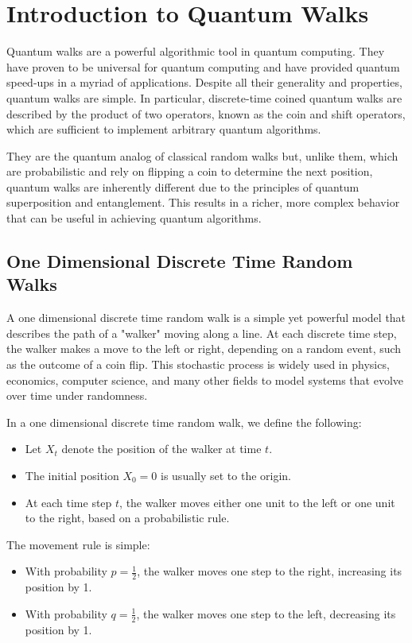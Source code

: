 \documentclass{article}
\begin{document}
\newpage

\section{Introduction to Quantum Walks}
	Quantum walks are a powerful algorithmic tool in quantum computing. They have proven to be universal for quantum computing \cite{universalcontrolplane} and have provided quantum speed-ups in a myriad of applications. Despite all their generality and properties, quantum walks are simple. In particular, discrete-time coined quantum walks are described by the product of two operators, known as the coin and shift operators, which are sufficient to implement arbitrary quantum algorithms.

	They are the quantum analog of classical random walks but, unlike them, which are probabilistic and rely on flipping a coin to determine the next position, quantum walks are inherently different due to the principles of quantum superposition and entanglement. This results in a richer, more complex behavior that can be useful in achieving quantum algorithms.

	\subsection{One Dimensional Discrete Time Random Walks}

		A one dimensional discrete time random walk is a simple yet powerful model that describes the path of a "walker" moving along a line. At each discrete time step, the walker makes a move to the left or right, depending on a random event, such as the outcome of a coin flip. This stochastic process is widely used in physics, economics, computer science, and many other fields to model systems that evolve over time under randomness.

		In a one dimensional discrete time random walk, we define the following:
		\begin{itemize}
			\item Let \( X_t \) denote the position of the walker at time \( t \).
			\item The initial position \( X_0 = 0 \) is usually set to the origin.
			\item At each time step \( t \), the walker moves either one unit to the left or one unit to the right, based on a probabilistic rule.
		\end{itemize}

		The movement rule is simple:
		\begin{itemize}
			\item With probability \( p = \frac{1}{2} \), the walker moves one step to the right, increasing its position by 1.
			\item With probability \( q = \frac{1}{2} \), the walker moves one step to the left, decreasing its position by 1.
		\end{itemize}
\end{document}
